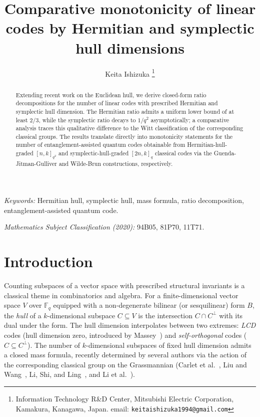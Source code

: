 \documentclass[11pt]{article}
\title{Comparative monotonicity of linear codes by Hermitian and symplectic hull dimensions}
\author{Keita Ishizuka
\thanks{Information Technology R\&D Center,
Mitsubishi Electric Corporation, Kamakura, Kanagawa, Japan.
email: \texttt{keitaishizuka1994@gmail.com}}}
\date{}
\theoremstyle{plain}
\theoremstyle{remark}
\newcommand{\F}{\mathbb{F}}
\begin{document}
\maketitle

\begin{abstract}
Extending recent work on the Euclidean hull, we derive closed-form ratio
decompositions for the number of linear codes with prescribed Hermitian and
symplectic hull dimension. The Hermitian ratio admits a uniform lower bound
of at least $2/3$, while the symplectic ratio decays to $1/q^2$ asymptotically;
a comparative analysis traces this qualitative difference to the Witt
classification of the corresponding classical groups. The results translate
directly into monotonicity statements for the number of entanglement-assisted
quantum codes obtainable from Hermitian-hull-graded $[n, k]_{q^2}$ and
symplectic-hull-graded $[2n, k]_q$ classical codes via the
Guenda-Jitman-Gulliver and Wilde-Brun constructions, respectively.
\end{abstract}

\medskip
\noindent\emph{Keywords:} Hermitian hull, symplectic hull, mass formula, ratio decomposition, entanglement-assisted quantum code.

\medskip
\noindent\emph{Mathematics Subject Classification (2020):} 94B05, 81P70, 11T71.

\section{Introduction}

Counting subspaces of a vector space with prescribed structural invariants is a classical
theme in combinatorics and algebra. For a finite-dimensional vector space $V$ over $\F_q$
equipped with a non-degenerate bilinear (or sesquilinear) form $B$, the
\emph{hull} of a $k$-dimensional subspace $C \subseteq V$ is the intersection
$C \cap C^\perp$ with its dual under the form. The hull dimension interpolates
between two extremes: \emph{LCD} codes (hull dimension zero,
introduced by Massey~\cite{Massey1992}) and \emph{self-orthogonal} codes ($C \subseteq C^\perp$).
The number of $k$-dimensional subspaces of fixed hull dimension admits a
closed mass formula, recently determined by several authors via the action of the
corresponding classical group on the Grassmannian (Carlet et al.~\cite{CarletMesnagerTang2018},
Liu and Wang~\cite{LiuWang2019}, Li, Shi, and Ling~\cite{LiShiLing2024}, and Li et al.~\cite{LSL2024}).
\end{document}
